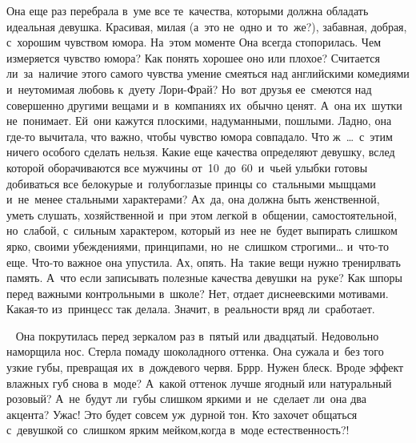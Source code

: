 Она еще раз перебрала в~уме все те~качества, которыми должна обладать идеальная девушка.
Красивая, милая (а~это не~одно и~то~же?), забавная, добрая, с~хорошим чувством юмора.
На~этом моменте Она всегда стопорилась.
Чем измеряется чувство юмора? Как понять хорошее оно или плохое? Считается ли~за~наличие этого самого чувства умение смеяться над английскими комедиями и~неутомимая любовь к~дуету Лори-Фрай? Но~вот друзья ее~смеются над совершенно другими вещами и~в~компаниях их~обычно ценят.
А~она их~шутки не~понимает.
Ей~они кажутся плоскими, надуманными, пошлыми.
Ладно, она где-то вычитала, что важно, чтобы чувство юмора совпадало.
Что ж~…~с~этим ничего особого сделать нельзя.
Какие еще качества определяют девушку, вслед которой оборачиваются все мужчины от~10~до~60~и~чьей улыбки готовы добиваться все белокурые и~голубоглазые принцы со~стальными мыщцами и~не~менее стальными характерами? Ах~да, она должна быть женственной, уметь слушать, хозяйственной и~при этом легкой в~общении, самостоятельной, но~слабой, с~сильным характером, который из~нее не~будет выпирать слишком ярко, своими убеждениями, принципами, но~не~слишком строгими… и~что-то еще.
Что-то важное она упустила.
Ах, опять.
На~такие вещи нужно тренирлвать память.
А~что если записывать полезные качества девушки на~руке? Как шпоры перед важными контрольными в~школе? Нет, отдает диснеевскими мотивами.
Какая-то из~принцесс так делала.
Значит, в~реальности вряд ли~сработает.
 

~
Она покрутилась перед зеркалом раз в~пятый или двадцатый.
Недовольно наморщила нос.
Стерла помаду шоколадного оттенка.
Она сужала и~без того узкие губы, превращая их~в~дождевого червя.
Бррр.
Нужен блеск.
Вроде эффект влажных губ снова в~моде? А~какой оттенок лучше ягодный или натуральный розовый? А~не~будут ли~губы слишком яркими и~не~сделает ли~она два акцента? Ужас! Это будет совсем уж~дурной тон.
Кто захочет общаться с~девушкой со~слишком ярким мейком,когда в~моде естественность?!
 

